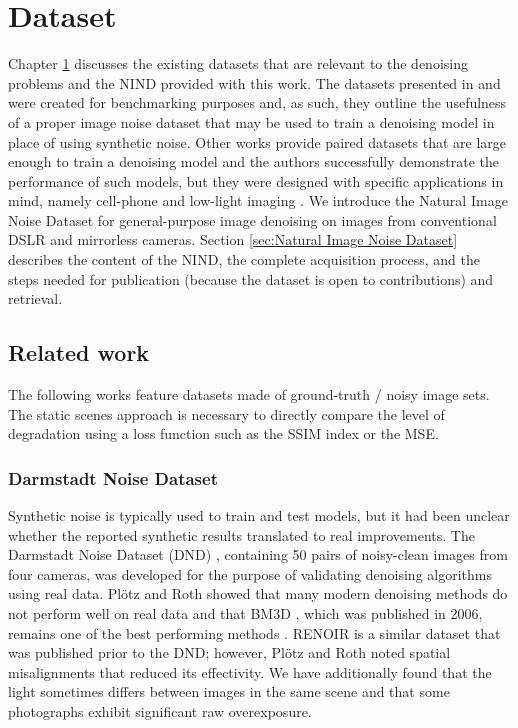 \chapter{Dataset}\label{chap:Dataset}


Chapter \ref{chap:Dataset} discusses the existing datasets that are relevant to the denoising problems and the \acl{NIND} provided with this work. The datasets presented in \cite{darmstadt} and \cite{renoir} were created for benchmarking purposes and, as such, they outline the usefulness of a proper image noise dataset that may be used to train a denoising model in place of using synthetic noise. Other works provide paired datasets that are large enough to train a denoising model and the authors successfully demonstrate the performance of such models, but they were designed with specific applications in mind, namely cell-phone \cite{sidd} and low-light imaging \cite{learningtoseeinthedark}. We introduce the \acl{Natural Image Noise Dataset} for general-purpose image denoising on images from conventional \ac{DSLR} and mirrorless cameras. Section \ref{sec:Natural Image Noise Dataset} describes the content of the \ac{NIND}, the complete acquisition process, and the steps needed for publication (because the dataset is open to contributions) and retrieval.

\section{Related work}
The following works feature datasets made of ground-truth / noisy image sets. The static scenes approach is necessary to directly compare the level of degradation using a loss function such as the \ac{SSIM} index or the \ac{MSE}. 
\subsection{Darmstadt Noise Dataset}
Synthetic noise is typically used to train and test models, but it had been unclear whether the reported synthetic results translated to real improvements. The Darmstadt Noise Dataset (DND) \cite{darmstadt}, containing 50 pairs of noisy-clean images from four cameras, was developed for the purpose of validating denoising algorithms using real data. Plötz and Roth showed that many modern denoising methods do not perform well on real data and that \ac{BM3D} \cite{bm3d}, which was published in 2006, remains one of the best performing methods \cite{darmstadt}. RENOIR \cite{renoir} is a similar dataset that was published prior to the DND; however, Plötz and Roth noted spatial misalignments that reduced its effectivity. We have additionally found that the light sometimes differs between images in the same scene and that some photographs exhibit significant raw overexposure.
